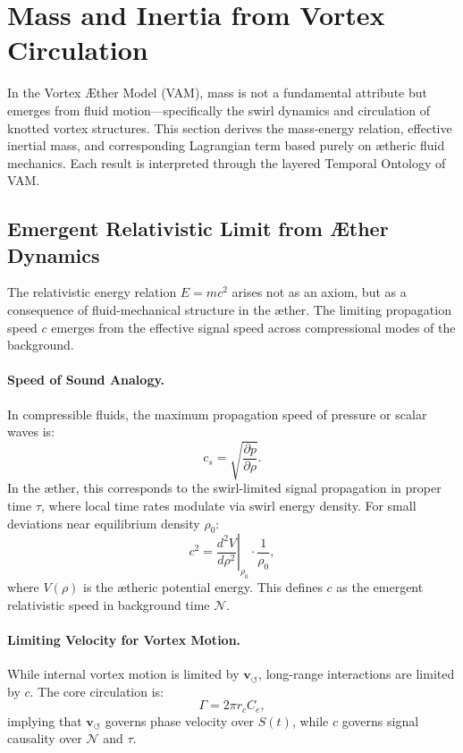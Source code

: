 \documentclass[12pt]{article}
\begin{document}
\section{Mass and Inertia from Vortex Circulation}

In the Vortex \AE{}ther Model (VAM), mass is not a fundamental attribute but emerges from fluid motion—specifically the swirl dynamics and circulation of knotted vortex structures. This section derives the mass-energy relation, effective inertial mass, and corresponding Lagrangian term based purely on \ae{}theric fluid mechanics. Each result is interpreted through the layered Temporal Ontology of VAM.

\subsection{Emergent Relativistic Limit from \AE{}ther Dynamics}

The relativistic energy relation \( E = mc^2 \) arises not as an axiom, but as a consequence of fluid-mechanical structure in the \ae{}ther. The limiting propagation speed \( c \) emerges from the effective signal speed across compressional modes of the background.

\paragraph{Speed of Sound Analogy.}
In compressible fluids, the maximum propagation speed of pressure or scalar waves is:
\[
    c_s = \sqrt{\frac{\partial p}{\partial \rho}}.
\]
In the \ae{}ther, this corresponds to the swirl-limited signal propagation in proper time \( \tau \), where local time rates modulate via swirl energy density. For small deviations near equilibrium density \( \rho_0 \):
\[
    c^2 = \left.\frac{d^2 V}{d\rho^2} \right|_{\rho_0} \cdot \frac{1}{\rho_0},
\]
where \( V(\rho) \) is the \ae{}theric potential energy. This defines \( c \) as the emergent relativistic speed in background time \( \mathcal{N} \).

\paragraph{Limiting Velocity for Vortex Motion.}
While internal vortex motion is limited by \( \mathbf{v}_{\scriptscriptstyle\boldsymbol{\circlearrowleft}} \), long-range interactions are limited by \( c \). The core circulation is:
\[
    \Gamma = 2\pi r_c C_e,
\]
implying that \( \mathbf{v}_{\scriptscriptstyle\boldsymbol{\circlearrowleft}} \) governs phase velocity over $S(t)$, while \( c \) governs signal causality over $\mathcal{N}$ and $\tau$.
\end{document}
